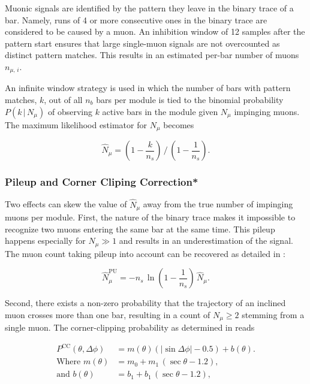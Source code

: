 Muonic signals are identified by the pattern they leave in the binary trace of
a bar. Namely, runs of 4 or more consecutive ones in the binary trace are 
considered to be caused by a muon. An inhibition window of 12 samples after the
pattern start ensures that large single-muon signals are not overcounted as 
distinct pattern matches. This results in an estimated per-bar number of muons 
$n_{\mu,\,i}$.

An infinite window strategy \cite{hayashidaMuons1GeV1995, 
gesualdiMuonContentAtmospheric2023} is used in which the number of bars with
pattern matches, $k$, out of all $n_b$ bars per module is tied to the binomial 
probability $P(k\,|\,N_\mu)$ of observing $k$ active bars in the module given 
$N_\mu$ impinging muons. The maximum likelihood estimator for $N_\mu$ becomes 
\cite{supanitskyEstimationNumberMuons2021}

\begin{equation}
	\label{eq:muon-number}
	\hat{N}_\mu = \left(1 - \frac{k}{n_s}\right)\,/\,\left(1 - \frac{1}{n_s}\right).
\end{equation}

\subsubsection{Pileup and Corner Cliping Correction*}
\label{sssec:umd-reconstruction-corrections}


Two effects can skew the value of $\hat{N}_\mu$ away from the true number of 
impinging muons per module. First, the nature of the binary trace makes it 
impossible to recognize two muons entering the same bar at the same time. This
pileup happens especially for $N_\mu \gg 1$ and results in an underestimation 
of the \UMD signal. The muon count taking pileup into account can be recovered 
as detailed in \cite{scornavaccheMuonContentExtensive2025}:

\begin{equation}
	\label{eq:pileup-correction}
	\hat{N}^\mathrm{PU}_\mu = -n_s\,\ln\left(1-\frac{1}{n_s}\right)\,\hat{N}_\mu.
\end{equation}

Second, there exists a non-zero probability that the trajectory of an inclined muon crosses more than one bar, resulting in a count of $N_\mu\geq2$ stemming 
from a single muon. The corner-clipping probability as determined in 
\cite{jesusStudyMassComposition2025} reads

\begin{align}
	\label{eq:corner-clipping-probability}
	P^\mathrm{CC}(\theta, \Delta\phi) &= m(\theta) \left(\left|\sin\Delta\phi\right| - 0.5 \right) + b(\theta). \\ 
	\text{Where}\,\, m(\theta) &= m_0 + m_1\,\left(\sec\theta - 1.2\right), \\
	\text{and}\,\, b(\theta) &= b_1 + b_1\,\left(\sec\theta - 1.2\right),
\end{align}


